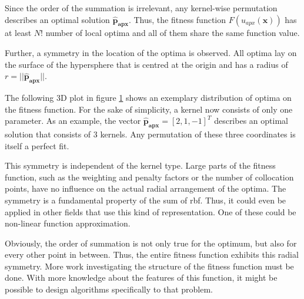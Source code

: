 \documentclass[./\jobname.tex]{subfiles}
\begin{document}
Since the order of the summation is irrelevant, any kernel-wise permutation describes an optimal solution $\mathbf{\hat{p}_{apx}}$. Thus, the fitness function $F(u_{apx}(\mathbf{x}))$ has at least $N!$ number of local optima and all of them share the same function value. 

Further, a symmetry in the location of the optima is observed. All optima lay on the surface of the hypersphere that is centred at the origin and has a radius of $r = || \mathbf{\hat{p}_{apx}} ||$. 

The following 3D plot in figure \ref{fig:optima_distribution} shows an exemplary distribution of optima on the fitness function. For the sake of simplicity, a kernel now consists of only one parameter. As an example, the vector $\mathbf{\hat{p}_{apx}} = \left[ 2, 1, -1 \right]^T$ describes an optimal solution that consists of 3 kernels. Any permutation of these three coordinates is itself a perfect fit. 

\begin{figure}[H]
	\centering
	\noindent{}
	\label{fig:optima_distribution}
\end{figure}

This symmetry is independent of the kernel type. Large parts of the fitness function, such as the weighting and penalty factors or the number of collocation points, have no influence on the actual radial arrangement of the optima. The symmetry is a fundamental property of the sum of \gls{rbf}. Thus, it could even be applied in other fields that use this kind of representation. One of these could be non-linear function approximation. 

Obviously, the order of summation is not only true for the optimum, but also for every other point in between. Thus, the entire fitness function exhibits this radial symmetry. More work investigating the structure of the fitness function must be done. With more knowledge about the features of this function, it might be possible to design algorithms specifically to that problem. 
\end{document}
